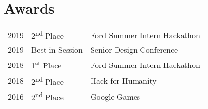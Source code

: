 \documentclass[]{deedy-resume-openfont}
\begin{document}
\begin{minipage}[t]{0.66\textwidth}



\section{Awards} 
\begin{tabular}{rll}
2019	     & 2\textsuperscript{nd} Place  & Ford Summer Intern Hackathon\\
2019	     & Best in Session & Senior Design Conference\\
2018	     & 1\textsuperscript{st} Place  & Ford Summer Intern Hackathon\\
2018	     & 2\textsuperscript{nd} Place  & Hack for Humanity\\
2016	     & 2\textsuperscript{nd} Place  & Google Games\\
\end{tabular}
\sectionsep

\end{minipage} 
\end{document}
